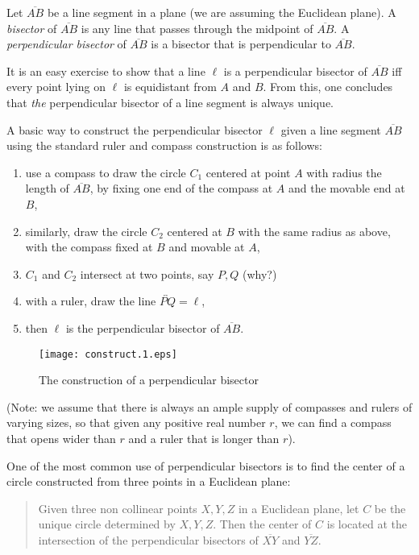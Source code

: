 \documentclass[12pt]{article}
\begin{document}
Let $\overline{AB}$ be a line segment in a plane (we are assuming the Euclidean plane).  A \emph{bisector} of $\overline{AB}$ is any line that passes through the midpoint of $\overline{AB}$.  A \emph{perpendicular bisector} of $\overline{AB}$ is a bisector that is perpendicular to $\overline{AB}$.

It is an easy exercise to show that a line $\ell$ is a perpendicular bisector of $\overline{AB}$ iff every point lying on $\ell$ is equidistant from $A$ and $B$.  From this, one concludes that \emph{the} perpendicular bisector of a line segment is always unique.

A basic way to construct the perpendicular bisector $\ell$ given a line segment $\overline{AB}$ using the standard ruler and compass construction is as follows:


\begin{enumerate}
\item use a compass to draw the circle $C_1$ centered at point $A$ with radius the length of $\overline{AB}$, by fixing one end of the compass at $A$ and the movable end at $B$,
\item similarly, draw the circle $C_2$ centered at $B$ with the same radius as above, with the compass fixed at $B$ and movable at $A$,
\item $C_1$ and $C_2$ intersect at two points, say $P,Q$ (why?)
\item with a ruler, draw the line $\overleftrightarrow{PQ}=\ell$,
\item then $\ell$ is the perpendicular bisector of $\overline{AB}$.
\end{enumerate}

\begin{center}
\begin{figure}[!htb]
\begin{center}
\texttt{[image: construct.1.eps]}
\caption{The construction of a perpendicular bisector}
\end{center}
\end{figure}
\end{center}

(Note: we assume that there is always an ample supply of compasses and rulers of varying sizes, so that given any positive real number $r$, we can find a compass that opens wider than $r$ and a ruler that is longer than $r$).

One of the most common use of perpendicular bisectors is to find the center of a circle constructed from three points in a Euclidean plane:
\begin{quote}
Given three non collinear points $X,Y,Z$ in a Euclidean plane, let $C$ be the unique circle determined by $X,Y,Z$.  Then the center of $C$ is located at the intersection of the perpendicular bisectors of $\overline{XY}$ and $\overline{YZ}$.
\end{quote}
\end{document}
